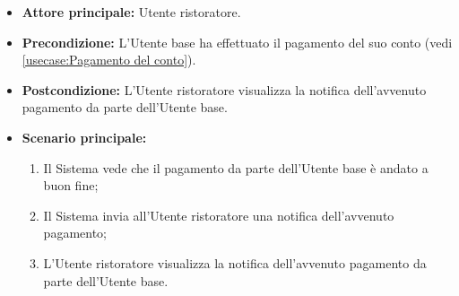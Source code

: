 \label{usecase:Visualizzazione notifica di avvenuto pagamento}
\begin{itemize}
	\item \textbf{Attore principale:} Utente ristoratore.

	\item \textbf{Precondizione:} L'Utente base ha effettuato il pagamento del suo conto (vedi \autoref{usecase:Pagamento del conto}).


	\item \textbf{Postcondizione:} L'Utente ristoratore visualizza la notifica
		dell'avvenuto pagamento da parte dell'Utente base.

	\item \textbf{Scenario principale:}
	      \begin{enumerate}
		      \item Il Sistema vede che il pagamento da parte dell'Utente base è andato a buon fine;
		      \item Il Sistema invia all'Utente ristoratore una notifica dell'avvenuto pagamento;
		      \item L'Utente ristoratore visualizza la notifica dell'avvenuto
		            pagamento da parte dell'Utente base.
	      \end{enumerate}
\end{itemize}
